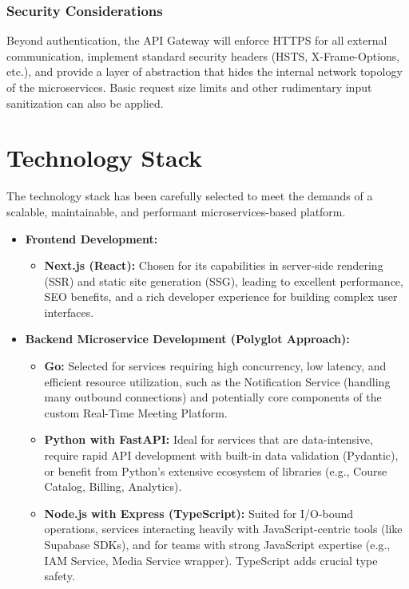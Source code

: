 \documentclass[12pt, a4paper]{report} %
\begin{document}
\begin{itemize}
  \subsection{Security Considerations}
    Beyond authentication, the API Gateway will enforce HTTPS for all external communication, implement standard security headers (HSTS, X-Frame-Options, etc.), and provide a layer of abstraction that hides the internal network topology of the microservices. Basic request size limits and other rudimentary input sanitization can also be applied.


\chapter{Technology Stack}
  The technology stack has been carefully selected to meet the demands of a scalable, maintainable, and performant microservices-based platform.
  \begin{itemize}
    \item \textbf{Frontend Development:}
        \begin{itemize}
            \item \textbf{Next.js (React):} Chosen for its capabilities in server-side rendering (SSR) and static site generation (SSG), leading to excellent performance, SEO benefits, and a rich developer experience for building complex user interfaces.
        \end{itemize}
    \item \textbf{Backend Microservice Development (Polyglot Approach):}
        \begin{itemize}
            \item \textbf{Go:} Selected for services requiring high concurrency, low latency, and efficient resource utilization, such as the Notification Service (handling many outbound connections) and potentially core components of the custom Real-Time Meeting Platform.
            \item \textbf{Python with FastAPI:} Ideal for services that are data-intensive, require rapid API development with built-in data validation (Pydantic), or benefit from Python's extensive ecosystem of libraries (e.g., Course Catalog, Billing, Analytics).
            \item \textbf{Node.js with Express (TypeScript):} Suited for I/O-bound operations, services interacting heavily with JavaScript-centric tools (like Supabase SDKs), and for teams with strong JavaScript expertise (e.g., IAM Service, Media Service wrapper). TypeScript adds crucial type safety.

\end{itemize}
\end{itemize}
\end{itemize}
\end{document}
